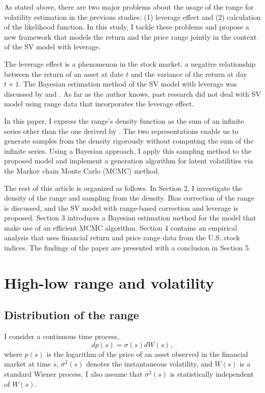 \documentclass[11pt]{article}
\begin{document}
As stated above, there are two major problems about the usage of the range for volatility estimation in the previous studies: 
(1) leverage effect and (2) calculation of the likelihood function. 
In this study, I tackle these problems and propose a new framework that models the return and the price range jointly in the context of the SV model with leverage. 

The leverage effect is a phenomenon in the stock market: a negative relationship between the return of an asset at date $t$ and the variance of the return at day $t+1$. 
The Bayesian estimation method of the SV model with leverage was discussed by \cite{Jacquier_etal(2004)} and \cite{Omori_etal(2007)}. 
As far as the author knows, past research did not deal with SV model using range data that incorporates the leverage effect. 

In this paper, I express the range's density function as the sum of an infinite series other than the one derived by \cite{Feller(1951)}. 
The two representations enable us to generate samples from the density rigorously without computing the sum of the infinite series.
Using a Bayesian approach, I apply this sampling method to the proposed model and implement a generation algorithm for latent volatilities via the Markov chain Monte Carlo (MCMC) method. 

The rest of this article is organized as follows. 
In Section 2, I investigate the density of the range and sampling from the density. 
Bias correction of the range is discussed, and the SV model with range-based correction and leverage is proposed. 
Section 3 introduces a Bayesian estimation method for the model that make use of an efficient MCMC algorithm. 
Section 4 contains an empirical analysis that uses financial return and price range data from the U.S. stock indices.
The findings of the paper are presented with a conclusion in Section 5.


\section{High-low range and volatility}
\subsection{Distribution of the range}
I consider a continuous time process, 
\begin{equation}
dp(s) =\sigma(s)dW(s),
\end{equation}
where $p(s)$ is the logarithm of the price of an asset observed in the financial market at time $s$, 
$\sigma^2(s)$ denotes the instantaneous volatility, 
and $W(s)$ is a standard Wiener process. 
I also assume that $\sigma^2(s)$ is statistically independent of $W(s)$. 
\end{document}
